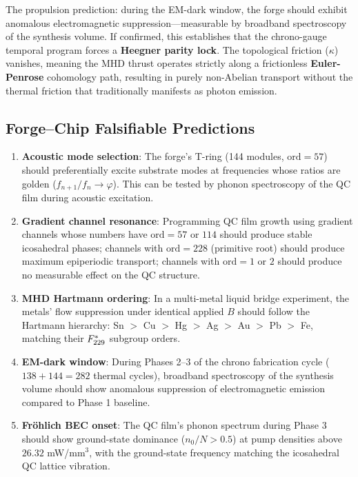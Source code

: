 \noindent The propulsion prediction: during the EM-dark window, the forge should exhibit anomalous electromagnetic suppression---measurable by broadband spectroscopy of the synthesis volume. If confirmed, this establishes that the chrono-gauge temporal program forces a \textbf{Heegner parity lock}. The topological friction ($\kappa$) vanishes, meaning the MHD thrust operates strictly along a frictionless \textbf{Euler-Penrose} cohomology path, resulting in purely non-Abelian transport without the thermal friction that traditionally manifests as photon emission.

\subsection{Forge--Chip Falsifiable Predictions}

\begin{enumerate}
    \item \textbf{Acoustic mode selection}: The forge's T-ring (144 modules, $\mathrm{ord} = 57$) should preferentially excite substrate modes at frequencies whose ratios are golden ($f_{n+1}/f_n \to \varphi$). This can be tested by phonon spectroscopy of the QC film during acoustic excitation.

    \item \textbf{Gradient channel resonance}: Programming QC film growth using gradient channels whose numbers have $\mathrm{ord} = 57$ or $114$ should produce stable icosahedral phases; channels with $\mathrm{ord} = 228$ (primitive root) should produce maximum epiperiodic transport; channels with $\mathrm{ord} = 1$ or $2$ should produce no measurable effect on the QC structure.

    \item \textbf{MHD Hartmann ordering}: In a multi-metal liquid bridge experiment, the metals' flow suppression under identical applied $B$ should follow the Hartmann hierarchy: Sn $>$ Cu $>$ Hg $>$ Ag $>$ Au $>$ Pb $>$ Fe, matching their $F_{229}^*$ subgroup orders.

    \item \textbf{EM-dark window}: During Phases 2--3 of the chrono fabrication cycle ($138 + 144 = 282$ thermal cycles), broadband spectroscopy of the synthesis volume should show anomalous suppression of electromagnetic emission compared to Phase 1 baseline.

    \item \textbf{Fröhlich BEC onset}: The QC film's phonon spectrum during Phase 3 should show ground-state dominance ($n_0/N > 0.5$) at pump densities above $26.32$ mW/mm$^3$, with the ground-state frequency matching the icosahedral QC lattice vibration.
\end{enumerate}


